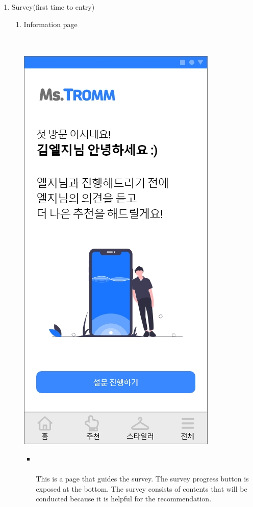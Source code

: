 \documentclass[conference]{IEEEtran}
\begin{document}
\begin{enumerate}
    \item Survey(first time to entry) 
    \begin{enumerate}
    \item Information page \\ \\ \\
    \centerline{\includegraphics[scale=0.32]{assets/설문지1.jpg}}
    \begin{itemize}
        \item[] \\ \\ This is a page that guides the survey. The survey progress button is exposed at the bottom. The survey consists of contents that will be conducted because it is helpful for the recommendation. \\ \\ \\ \\ \\ \\ \\ \\ \\ \\ \\ \\ \\ \\ \\ 


\end{itemize}
\end{enumerate}
\end{enumerate}
\end{document}
